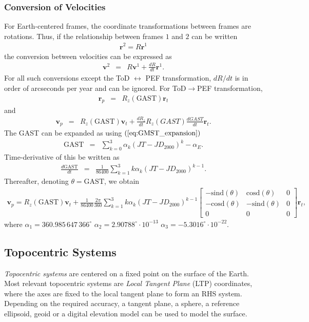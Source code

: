 \documentclass [12pt, a4paper] {article}
\newcommand{\sind}
{
	\textrm{sind}
}
\newcommand{\cosd}
{
	\textrm{cosd}
}
\newcommand{\vc}[1]
{
	\boldsymbol{#1}
}
\newcommand{\diff}[2]
{
	\frac{d #1}{d #2}
}
\begin{document}
\subsubsection{Conversion of Velocities}
For Earth-centered frames, the coordinate transformations between frames are 
rotations. Thus, if the relationship between frames $1$ and $2$ can be written
\begin {eqnarray}
  \vc r^2 = R\vc r^1
\end {eqnarray}
the conversion between velocities can be expressed as 
\begin {eqnarray}
  \vc v^2 &=& R\vc v^1 + \diff{R}{t}\vc r^1.
\end {eqnarray}
For all such conversions except the ToD $\leftrightarrow$ PEF transformation, 
$dR/dt$ is in order of arcseconds per year and can be ignored. 
For ToD$\rightarrow$PEF transformation, 
\begin {eqnarray}
  \vc r_p &=& R_z(\textrm{GAST})\vc r_{t}
\end {eqnarray}
and 
\begin {eqnarray}
  \vc v_p &=& R_z(\textrm{GAST})\vc v_t 
  + \diff{R_z}{t}R_z(GAST)\diff{GAST}{t}\vc r_t.
\end {eqnarray}
The GAST can be expanded as using $(\ref{eq:GMST_expansion})$
\begin {eqnarray}
  \textrm{GAST} &=& \sum_{k=0}^3 \alpha_k(JT - JD_{2000})^k - \alpha_E.
\end {eqnarray}
Time-derivative of this be written as 
\begin {eqnarray}
  \diff{\textrm{GAST}}{t} &=& 
  \frac{1}{86400}\sum_{k=1}^3 k\alpha_k (JT - JD_{2000})^{k-1}.
\end {eqnarray}
Thereafter, denoting $\theta = \textrm{GAST}$, we obtain
\begin {eqnarray}
  \vc v_p =
  R_z(\textrm{GAST})\vc v_t
  +
  \frac{1}{86400}
  \frac{2\pi}{360}
    \sum_{k=1}^3 k\alpha_k (JT - JD_{2000})^{k-1} 
  \begin {bmatrix}
    -\sind(\theta) & \cosd(\theta) & 0 \\
    -\cosd(\theta) & -\sind(\theta) & 0 \\
    0 & 0 & 0
  \end {bmatrix}\vc r_t,
\end {eqnarray}
where 
$\alpha_1 = 360.985\,647\,366^\circ$
$\alpha_2 = 2.90788^\circ\cdot 10^{-13}$
$\alpha_3 = -5.3016^\circ\cdot 10^{-22}$.

\subsection{Topocentric Systems}
\emph{Topocentric systems} are centered on a fixed point on the surface of the Earth.
Most relevant topocentric systems are \emph{Local Tangent Plane} (LTP) coordinates, where 
the axes are fixed to the local tangent plane to form an RHS system. 
Depending 
on the required accuracy, a tangent plane, a sphere, a reference ellipsoid, geoid or a digital elevation 
model can be used to model the surface. 
\end{document}

